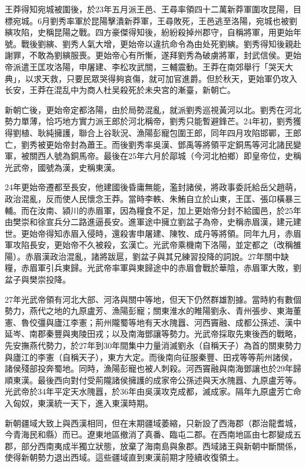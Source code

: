 王莽得知宛城被圍後，於23年五月派王邑、王尋率領四十二萬新莽軍圍攻昆陽，目標宛城。6月劉秀率軍於昆陽擊潰新莽軍，王尋敗死，王邑逃至洛陽，宛城也被劉縯攻陷，史稱昆陽之戰。四方豪傑得知後，紛紛殺掉州郡守，自稱將軍，用更始年號。戰後劉縯、劉秀人氣大增，更始帝以違抗命令為由处死劉縯。劉秀得知後親赴謝罪，不敢為劉縯服喪。更始帝心有所慚，遂拜劉秀為破虜將軍，封武信侯。更始帝派遣王匡攻洛陽，申屠建、李松攻武關，三輔震動。王莽在南郊舉行「哭天大典」，以求天救，只要民眾哭得夠哀傷，就可加官進爵。但於秋天，更始軍仍攻入长安，王莽在混乱中为商人杜吴殺死於未央宮的漸臺，新朝亡。

新朝亡後，更始帝定都洛陽，由於局勢混亂，就派劉秀巡視黃河以北。劉秀在河北勢力單薄，恰巧地方實力派王郎於河北稱帝，劉秀只能暫避鋒芒。24年初，劉秀獲得劉植、耿純擁護，聯合上谷耿況、漁陽彭寵包圍王郎，同年四月攻陷邯鄲，王郎亡，劉秀被更始帝封為蕭王。而後劉秀率吳漢、鄧禹等將領平定銅馬等河北諸民變軍，被關西人號為銅馬帝。最後在25年六月於鄗城（今河北柏鄉）即皇帝位，史稱光武帝，國號為漢，史稱東漢。

24年更始帝遷都至長安，他建國後昏庸無能，濫封諸侯，將政事委託給岳父趙萌，政治混亂，反而使人民懷念王莽。當時李軼、朱鮪自立於山東，王匡、張卬橫暴三輔。而在汝南、潁川的赤眉軍，因為糧食不足，加上更始帝分封不給國邑，於25年由樊崇和徐宣兵分二路進逼長安。進軍途中擁立劉盆子為帝，史稱赤眉漢，建元建世。更始帝得知赤眉入侵時，還殺害申屠建、陳牧、成丹等將領。同年九月，赤眉軍攻陷長安，更始帝不久被殺，玄漢亡。光武帝乘機南下洛陽，並定都之（改稱雒陽）。赤眉漢政治混亂，諸將跋扈，劉盆子與其兄練習投降的詞說。27年關中缺糧，赤眉軍引兵東歸。光武帝率軍與東歸途中的赤眉會戰於華陰，赤眉軍大敗，劉盆子與樊崇投降。

27年光武帝領有河北大部、河洛與關中等地，但天下仍然群雄割據。當時約有數個勢力，燕代之地的九原盧芳、漁陽彭寵；關東淮水的睢陽劉永、青州張步、東海董憲、魯佼彊與廬江李憲；荊州隴蜀等地有天水隗囂、河西竇融、成都公孫述、漢中延岑、南郡秦豐與夷陵田戎；以及南海鄧讓等勢力。光武帝採取先東後西的戰略，先安撫燕代勢力，於27年到30年間集中力量消滅劉永（自稱天子）為首的關東勢力與廬江的李憲（自稱天子），東方大定。而後南向征服秦豐、田戎等等荊州諸侯，諸侯殘部投奔蜀地。同時，漁陽彭寵也被人刺殺。河西竇融與南海鄧讓也於29年歸順東漢。最後西向對付受荊隴諸侯擁護的成家帝公孫述與天水隗囂、九原盧芳等。光武帝於34年平定天水隗囂，於36年由吳漢攻克成都，滅成家。隔年九原盧芳亡命入匈奴，東漢統一天下，進入東漢時期。

新朝疆域大致上與西漢相同，但在末期疆域萎縮，只新設了西海郡（郡治龍耆城，今青海民和縣）而已。遼東地區撤消了真番、臨屯二郡。在西南地區由七郡變成五郡，部分西南夷成半獨立狀態，放棄了海南島與象郡。西域諸王與新朝中斷關係，使得新朝勢力退出西域。這些疆域直到東漢前期才陸續收復領土。

